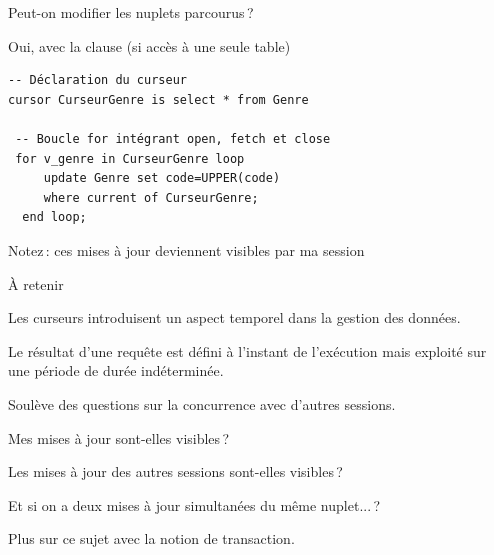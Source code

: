 \begin{frame}[fragile]{Peut-on modifier les nuplets parcourus\,?}

Oui, avec la clause  (si accès à une seule table)

\begin{small}
\begin{verbatim}
-- Déclaration du curseur
cursor CurseurGenre is select * from Genre 

 -- Boucle for intégrant open, fetch et close
 for v_genre in CurseurGenre loop
     update Genre set code=UPPER(code) 
     where current of CurseurGenre;
  end loop;
\end{verbatim}
\end{small}

\vfill

\alert{Notez}\,: ces mises à jour deviennent visibles par ma session
\end{frame}


\begin{frame}{À retenir}

Les curseurs introduisent un aspect \alert{temporel} dans la gestion des données.

\vfill


Le résultat d'une requête est défini à l'instant de l'exécution mais exploité sur une
période de durée indéterminée.

\vfill

Soulève des questions sur la \alert{concurrence} avec d'autres sessions.

\begin{redbullet}
   \item Mes mises à jour sont-elles visibles\,?
   \item Les mises à jour des autres sessions sont-elles visibles\,?
  \item Et si on a deux mises à jour  \alert{simultanées} du même nuplet...\,?
\end{redbullet}

\vfill

Plus sur ce sujet avec la notion de \alert{transaction}.
\end{frame}
